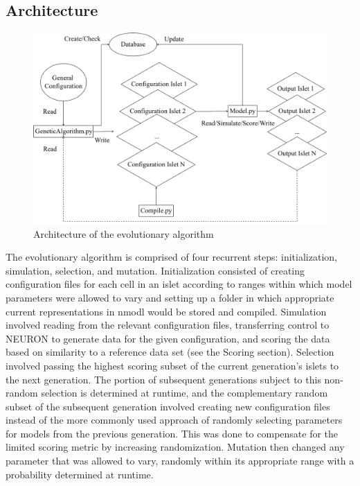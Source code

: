 \subsection{Architecture}
\begin{figure}[h!]
	\centering
	\includegraphics[scale=0.20]{Figures/architecture.png}
	\caption{Architecture of the evolutionary algorithm}
\end{figure}
The evolutionary algorithm is comprised of four recurrent steps: initialization, simulation, selection, and mutation. Initialization consisted of creating configuration files for each cell in an islet according to ranges within which model parameters were allowed to vary and setting up a folder in which appropriate current representations in nmodl would be stored and compiled. Simulation involved reading from the relevant configuration files, transferring control to NEURON to generate data for the given configuration, and scoring the data based on similarity to a reference data set (see the Scoring section). Selection involved passing the highest scoring subset of the current generation's islets to the next generation. The portion of subsequent generations subject to this non-random selection is determined at runtime, and the complementary random subset of the subsequent generation involved creating new configuration files instead of the more commonly used approach of randomly selecting parameters for models from the previous generation. This was done to compensate for the limited scoring metric by increasing randomization. Mutation then changed any parameter that was allowed to vary, randomly within its appropriate range with a probability determined at runtime.
